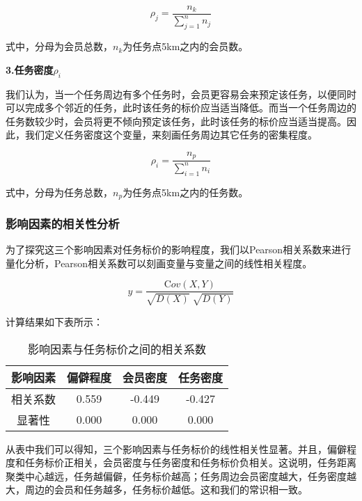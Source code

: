 \documentclass[withoutpreface,bwprint]{cumcmthesis} %
\begin{document}
\begin{equation}
{\rho _j} = \frac{{{n_k}}}{{\sum\limits_{j = 1}^n {{n_j}} }}
\end{equation}

式中，分母为会员总数，${n_k}$为任务点5km之内的会员数。

\textbf{3.任务密度${\rho_i}$}

我们认为，当一个任务周边有多个任务时，会员更容易会来预定该任务，以便同时可以完成多个邻近的任务，此时该任务的标价应当适当降低。而当一个任务周边的任务数较少时，会员将更不倾向预定该任务，此时该任务的标价应当适当提高。因此，我们定义任务密度这个变量，来刻画任务周边其它任务的密集程度。

\begin{equation}
{\rho _i} = \frac{{{n_p}}}{{\sum\limits_{i = 1}^n {{n_i}} }}
\end{equation}

式中，分母为任务总数，${n_p}$为任务点5km之内的任务数。


\subsubsection{影响因素的相关性分析}

为了探究这三个影响因素对任务标价的影响程度，我们以Pearson相关系数来进行量化分析，Pearson相关系数可以刻画变量与变量之间的线性相关程度。

\begin{equation}
{y=\frac{\mbox{C}ov\left( X,Y \right)}{\sqrt{D\left( X \right)}\; \sqrt{D\left( Y \right)}}}
\end{equation}

计算结果如下表所示：

\begin{table}[H]
	\centering
	\caption{影响因素与任务标价之间的相关系数}
	\begin{tabular}{|c|c|c|c|}
	\hline
	影响因素 & 偏僻程度  & 会员密度   & 任务密度   \\ \hline
	相关系数 & 0.559 & -0.449 & -0.427 \\ \hline
	显著性  & 0.000 & 0.000  & 0.000  \\ \hline
	\end{tabular}
\end{table}
\vspace{-0.8cm}

从表中我们可以得知，三个影响因素与任务标价的线性相关性显著。并且，偏僻程度和任务标价正相关，会员密度与任务密度和任务标价负相关。这说明，任务距离聚类中心越远，任务越偏僻，任务标价越高；任务周边会员密度越大，任务密度越大，周边的会员和任务越多，任务标价越低。这和我们的常识相一致。
\end{document}
